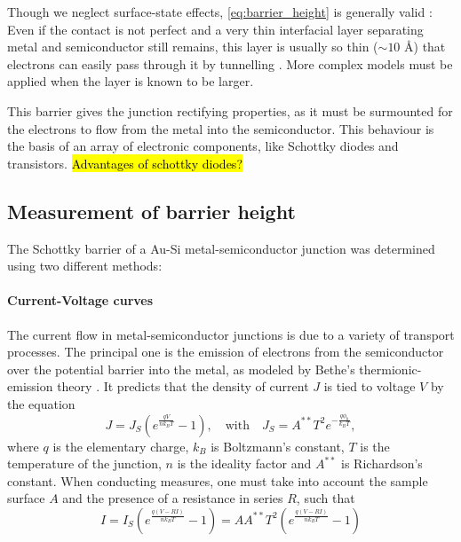 Though we neglect surface-state effects, \autoref{eq:barrier_height} is generally valid \cite{sze_physics_2007}:
Even if the contact is not perfect and a very thin interfacial layer separating metal and semiconductor still remains, this layer is usually so thin ($\sim 10$ \AA) that electrons can easily pass through it by tunnelling \cite{rhoderick_physics_1970}.
More complex models must be applied when the layer is known to be larger.

This barrier gives the junction rectifying properties, as it must be surmounted for the electrons to flow from the metal into the semiconductor.
This behaviour is the basis of an array of electronic components, like Schottky diodes and transistors.
\hl{Advantages of schottky diodes?}

\subsection{Measurement of barrier height}
The Schottky barrier of a Au-Si metal-semiconductor junction was determined using two different methods:

\paragraph{Current-Voltage curves}
The current flow in metal-semiconductor junctions is due to a variety of transport processes.
The principal one is the emission of electrons from the semiconductor over the potential barrier into the metal, as modeled by Bethe's thermionic-emission theory \cite{sze_physics_2007}.
It predicts that the density of current $J$ is tied to voltage $V$ by the equation
\begin{equation} \label{eq:thermionic_emission_current}
    J = J_S \left( e^{\frac{qV}{n k_B T}} - 1 \right), \quad \text{{with}} \quad J_S = A^{**} T^2 e^{-\frac{q \phi_b}{k_B T}},
\end{equation}
where $q$ is the elementary charge, $k_B$ is Boltzmann's constant, $T$ is the temperature of the junction, $n$ is the ideality factor and $A^{**}$ is Richardson's constant.
When conducting measures, one must take into account the sample surface $A$ and the presence of a resistance in series $R$, such that
\begin{equation}
    I = I_S \left( e^{\frac{q (V- RI)}{n k_B T}} - 1\right) = A A^{**} T^2 \left( e^{\frac{q (V- RI)}{n k_B T}} - 1\right)
\end{equation}



